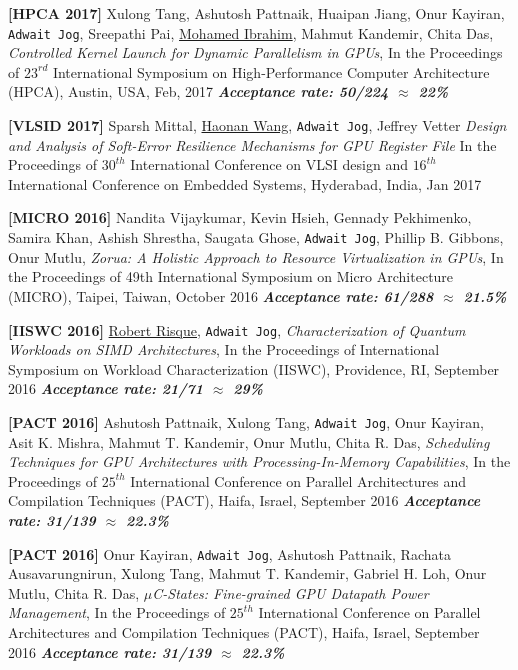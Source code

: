 \documentclass[10pt,a4]{article}
\begin{document}
\begin{description}
\item 
{\bf [HPCA 2017]}
Xulong Tang, Ashutosh Pattnaik, Huaipan Jiang, Onur Kayiran, {\tt Adwait Jog}, Sreepathi Pai, \underline{Mohamed Ibrahim},
Mahmut Kandemir, Chita Das, 
{\it Controlled Kernel Launch for Dynamic Parallelism in GPUs},
In the Proceedings of $23^{rd}$ International Symposium on High-Performance Computer Architecture (HPCA), 
Austin, USA, Feb, 2017
\textbf{\textit{Acceptance rate: 50/224 $\approx$ 22\%}}

\item 
{\bf [VLSID 2017]}
Sparsh Mittal, \underline{Haonan Wang}, {\tt Adwait Jog}, Jeffrey Vetter
{\it Design and Analysis of Soft-Error Resilience Mechanisms for GPU Register File}
In the Proceedings of $30^{th}$ International Conference on VLSI design and $16^{th}$ International Conference on
Embedded Systems, Hyderabad, India, Jan 2017

\item
{\bf [MICRO 2016]}
Nandita Vijaykumar, Kevin Hsieh, Gennady Pekhimenko, Samira Khan, Ashish Shrestha, Saugata Ghose, {\tt Adwait Jog}, Phillip B. Gibbons, Onur Mutlu, 
{\it Zorua: A Holistic Approach to Resource Virtualization in GPUs},
In the Proceedings of 49th International Symposium on Micro Architecture (MICRO), Taipei, Taiwan, October 2016 
\textbf{\textit{Acceptance rate: 61/288 $\approx$ 21.5\%}}

\item
{\bf [IISWC 2016]}
\underline{Robert Risque}, {\tt Adwait Jog}, 
{\it Characterization of Quantum Workloads on SIMD Architectures},
In the Proceedings of International Symposium on Workload Characterization (IISWC), Providence, RI, September 2016 
\textbf{\textit{Acceptance rate: 21/71 $\approx$ 29\%}}

\item
{\bf [PACT 2016]}
Ashutosh Pattnaik, Xulong Tang, {\tt Adwait Jog}, Onur Kayiran, Asit K. Mishra, Mahmut T. Kandemir, 
Onur Mutlu, Chita R. Das, 
{\it Scheduling Techniques for GPU Architectures with Processing-In-Memory Capabilities},
In the Proceedings of $25^{th}$ International Conference on Parallel Architectures and Compilation Techniques (PACT), 
Haifa, Israel, September 2016 
\textbf{\textit{Acceptance rate: 31/139 $\approx$ 22.3\%}}

\item
{\bf [PACT 2016]}
Onur Kayiran, {\tt Adwait Jog}, Ashutosh Pattnaik, Rachata Ausavarungnirun, Xulong Tang, Mahmut T. Kandemir, Gabriel H. Loh, Onur Mutlu, Chita R. Das, 
{\it $\mu$C-States: Fine-grained GPU Datapath Power Management},
In the Proceedings of $25^{th}$ International Conference on Parallel Architectures and Compilation Techniques (PACT), 
Haifa, Israel, September 2016 
\textbf{\textit{Acceptance rate: 31/139 $\approx$ 22.3\%}}


\end{description}
\end{document}
